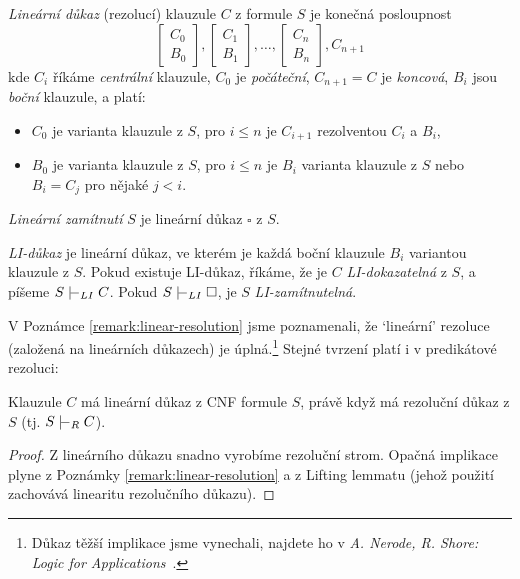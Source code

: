 \begin{definition}
    \emph{Lineární důkaz} (rezolucí) klauzule $C$ z formule $S$ je konečná posloupnost
    $$
    \begin{bmatrix}
        C_0 \\
        B_0
    \end{bmatrix},
    \begin{bmatrix}
        C_1 \\
        B_1
    \end{bmatrix},\dots,
    \begin{bmatrix}
        C_n \\
        B_n
    \end{bmatrix},
    C_{n+1}
    $$
    kde $C_i$ říkáme \emph{centrální} klauzule, $C_0$ je \emph{počáteční}, $C_{n+1}=C$ je \emph{koncová}, $B_i$ jsou \emph{boční} klauzule, a platí:
    \begin{itemize}
        \item $C_0$ je varianta klauzule z $S$, pro $i\leq n$ je $C_{i+1}$ rezolventou $C_i$ a $B_i$,
        \item $B_0$ je varianta klauzule z $S$, pro $i\leq n$ je $B_i$ varianta klauzule z $S$ nebo $B_i=C_j$ pro nějaké $j<i$. 
    \end{itemize}
    \emph{Lineární zamítnutí} $S$ je lineární důkaz $\square$ z $S$.
    
    \emph{LI-důkaz} je lineární důkaz, ve kterém je každá boční klauzule $B_i$ variantou klauzule z $S$. Pokud existuje LI-důkaz, říkáme, že je $C$ \emph{LI-dokazatelná} z $S$, a píšeme $S\proves_{LI}C$. Pokud $S\proves_{LI}\square$, je $S$ \emph{LI-zamítnutelná}.
\end{definition}

V Poznámce \ref{remark:linear-resolution} jsme poznamenali, že `lineární' rezoluce (založená na lineárních důkazech) je úplná.\footnote{Důkaz těžší implikace jsme vynechali, najdete ho v \emph{A. Nerode, R. Shore: Logic for Applications}~\cite{nerode_logic_2012}.} Stejné tvrzení platí i v predikátové rezoluci:

\begin{theorem}
Klauzule $C$ má lineární důkaz z CNF formule $S$, právě když má rezoluční důkaz z $S$ (tj. $S\proves_R C$).
\end{theorem}
\begin{proof}
Z lineárního důkazu snadno vyrobíme rezoluční strom. Opačná implikace plyne z Poznámky \ref{remark:linear-resolution} a z Lifting lemmatu (jehož použití zachovává linearitu rezolučního důkazu).
\end{proof}

